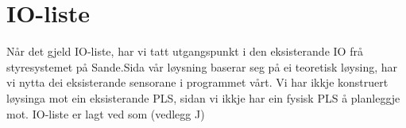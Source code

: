 \section{IO-liste}
\thispagestyle{fancy}

Når det gjeld \gls{IO}-liste, har vi tatt utgangspunkt i den eksisterande IO frå styresystemet på Sande.\newline Sida vår løysning baserar seg på ei teoretisk løysing,
har vi nytta dei eksisterande sensorane i programmet vårt. Vi har ikkje konstruert løysinga mot ein eksisterande \gls{PLS}, sidan vi 
ikkje har ein fysisk \gls{PLS} å planleggje  mot. \gls{IO}-liste er lagt ved som (vedlegg J)


%
%




